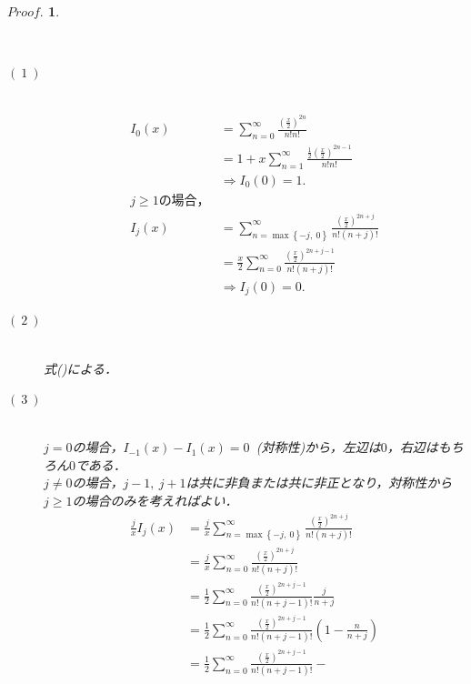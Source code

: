 \documentclass[a4j,papersize,disablejfam,slide,14pt]{jsarticle}
\newtheorem{Proof}{$Proof.$}
\def\max#1#2{\operatorname{max} \left\{ #1,\ #2 \right\}} %
\begin{document}
    \begin{Proof}
    	\begin{description}
        	\item[]\mbox{}\\
        	\item[$(\ 1\ )$]\mbox{}\\
            	\begin{align}
                	I_0(x) &= \sum_{n=0}^{\infty} \frac{\left( \frac{x}{2} \right)^{2n}}{n!n!} \\
                    &= 1 + x \sum_{n=1}^{\infty} \frac{\frac{1}{2}\left( \frac{x}{2} \right)^{2n-1}}{n!n!} \\
                    &\Rightarrow I_0(0) = 1. \\
                    \mbox{$j \geq 1$の場合，}&\\
                    I_j(x) &= \sum_{n=\max{-j}{0}}^{\infty} \frac{\left( \frac{x}{2} \right)^{2n+j}}{n!(n+j)!} \\
                    &= \frac{x}{2} \sum_{n=0}^{\infty} \frac{\left( \frac{x}{2} \right)^{2n+j-1}}{n!(n+j)!} \\
                    &\Rightarrow I_j(0) = 0.
                \end{align}
            \item[$(\ 2\ )$]\mbox{}\\
            	式()による．
            \item[$(\ 3\ )$]\mbox{}\\
            	$j=0$の場合，$I_{-1}(x) - I_{1}(x)=0$\ (対称性)から，左辺は$0$，右辺はもちろん$0$である．\\
                $j \neq 0$の場合，$j-1,\ j+1$は共に非負または共に非正となり，対称性から$j \geq 1$の場合のみを考えればよい．
            	\begin{align}
                	\frac{j}{x} I_j(x) &= \frac{j}{x} \sum_{n=\max{-j}{0}}^{\infty} \frac{\left( \frac{x}{2} \right)^{2n+j}}{n!(n+j)!} \\
                    &= \frac{j}{x} \sum_{n=0}^{\infty} \frac{\left( \frac{x}{2} \right)^{2n+j}}{n!(n+j)!} \\
                    &= \frac{1}{2} \sum_{n=0}^{\infty} \frac{\left( \frac{x}{2} \right)^{2n+j-1}}{n!(n+j-1)!} \frac{j}{n+j} \\
                    &= \frac{1}{2} \sum_{n=0}^{\infty} \frac{\left( \frac{x}{2} \right)^{2n+j-1}}{n!(n+j-1)!} \left(1 - \frac{n}{n+j} \right) \\
                    &= \frac{1}{2} \sum_{n=0}^{\infty} \frac{\left( \frac{x}{2} \right)^{2n+j-1}}{n!(n+j-1)!} -

\end{align}
\end{description}
\end{Proof}
\end{document}
